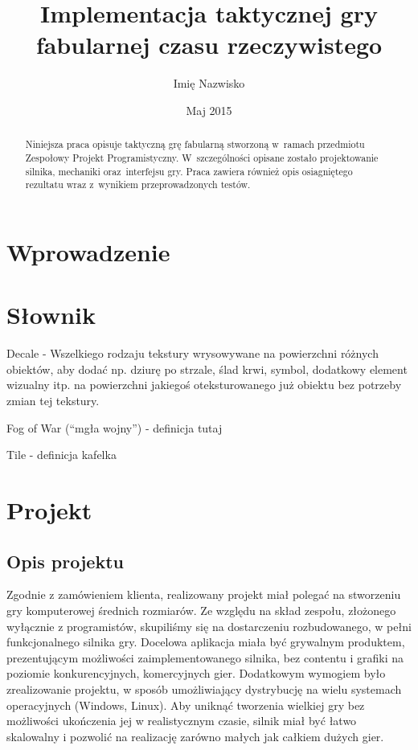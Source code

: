 \documentclass[licencjacka]{pracamgr}
\author	{Imię Nazwisko}
\title{Implementacja taktycznej gry fabularnej czasu rzeczywistego}
\date{Maj 2015}
\begin{document}
\maketitle

\begin{abstract}
  Niniejsza praca opisuje taktyczną grę fabularną stworzoną
  w~ramach przedmiotu Zespołowy Projekt Programistyczny.
  W~szczególności opisane zostało projektowanie silnika,
  mechaniki oraz~interfejsu gry. Praca zawiera również
  opis osiagniętego rezultatu wraz z~wynikiem przeprowadzonych testów.
\end{abstract}

\tableofcontents

\chapter*{Wprowadzenie}


\chapter{Słownik}
  Decale - Wszelkiego rodzaju tekstury wrysowywane na powierzchni różnych obiektów, aby dodać np. dziurę po strzale,
  ślad krwi, symbol, dodatkowy element wizualny itp. na powierzchni jakiegoś oteksturowanego już obiektu bez potrzeby
  zmian tej tekstury.

  Fog of War (``mgła wojny'') - definicja tutaj

  Tile - definicja kafelka

\chapter{Projekt}

  \section{Opis projektu}
  Zgodnie z zamówieniem klienta, realizowany projekt miał polegać na stworzeniu gry komputerowej
  średnich rozmiarów. Ze względu na skład zespołu, złożonego wyłącznie z programistów, skupiliśmy się
  na dostarczeniu rozbudowanego, w pełni funkcjonalnego silnika gry.
  Docelowa aplikacja miała być grywalnym produktem, prezentującym możliwości zaimplementowanego silnika,
  bez contentu i grafiki na poziomie konkurencyjnych, komercyjnych gier. Dodatkowym wymogiem było zrealizowanie
  projektu, w sposób umożliwiający dystrybucję na wielu systemach operacyjnych (Windows, Linux). Aby uniknąć
  tworzenia wielkiej gry bez możliwości ukończenia jej w realistycznym czasie, silnik miał być łatwo skalowalny
  i pozwolić na realizację zarówno małych jak całkiem dużych gier.
\end{document}
